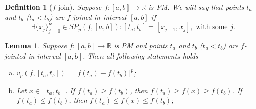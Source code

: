 \documentclass[12pt, a4paper]{article}
\newtheorem{lemma}[theorem]{Lemma}
\newtheorem{definition}[theorem]{Definition}
\numberwithin{equation}{section}
\begin{document}
\begin{definition}[$f$-join]\label{def:fjoin}
  Suppose $f:[a,b] \rightarrow \mathbb{R}$ is PM.
  We will say that points $t_a$ and $t_b$ ($t_a<t_b$) 
  are \emph{$f$-joined} in interval $[a,b]$ if 
  \begin{equation}
    \exists \{x_j\}_{j=0}^{n} \in SP_{p}(f,[a,b]):
      [t_a,t_b]=[x_{j-1},x_j], \text{ with some } j.
  \end{equation}  
\end{definition}

\begin{lemma}\label{lm:fjoin} 
  Suppose $f:[a,b] \rightarrow \mathbb{R}$ is PM and 
  points $t_a$ and $t_b$ ($t_a<t_b$) are 
  $f$-jointed in interval $[a,b]$.
  Then all following statements holds   
  \begin{enumerate}[a)]
    \item \label{lm:fjoin_a} 
    $v_p(f, [t_a,t_b]) = \left|f(t_a)-f(t_b)\right|^p$;
    
    \item \label{lm:fjoin_b} 
    Let $x \in [t_a, t_b]$. 
    If $f(t_a) \geq f(t_b)$, then $f(t_a) \geq f(x) \geq f(t_b)$.
    If $f(t_a) \leq f(t_b)$, then $f(t_a) \leq f(x) \leq f(t_b)$;
    
  \end{enumerate}
\end{lemma}
\end{document}
